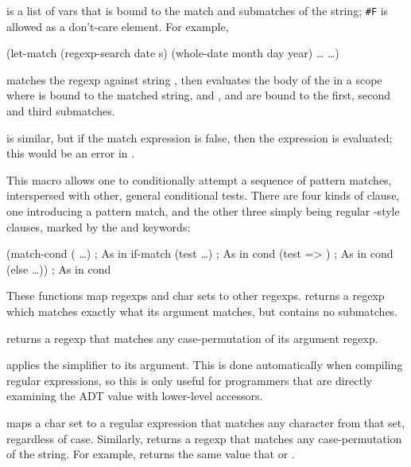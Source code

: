 \begin{desc}
     is a list of vars that is bound to the match and submatches
    of the string; \verb|#F| is allowed as a don't-care element. For example,
\begin{code}
(let-match (regexp-search date s) (whole-date month day year)
  {\ldots}  {\ldots})\end{code}%
%
    matches the regexp against string , then evaluates the body of the
     in a scope where  is bound to the matched
    string, and ,  and  are bound to the first,
    second and third submatches.

     is similar, but if the match expression is false, 
    then the  expression is evaluated; this would be an
    error in .
\end{desc}

\begin{desc}
This macro allows one to conditionally attempt a sequence of pattern
matches, interspersed with other, general conditional tests.
There are four kinds of  clause, one introducing a pattern
match, and the other three simply being regular -style clauses,
marked by the  and  keywords:
\begin{code}
(match-cond (   \ldots) ; As in if-match
            (test   \ldots)           ; As in cond
            (test  => )            ; As in cond
            (else  \ldots))              ; As in cond\end{code}%
\end{desc}

\begin{desc}
These functions map regexps and char sets to other regexps.
 returns a regexp which matches exactly what
its argument matches, but contains no submatches.

 returns a regexp that matches any case-permutation of
its argument regexp.

 applies the simplifier to its argument.
This is done automatically when compiling regular expressions,
so this is only useful for programmers that are directly examining
the ADT value with lower-level accessors.

 maps a char set to a regular expression that 
matches any character from that set, regardless of case. 
Similarly,  returns a regexp that matches any 
case-permutation of the string. For example, 
 returns the same value that
or .
\end{desc}


